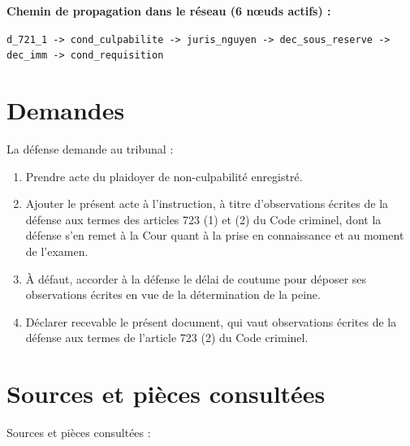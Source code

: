 \documentclass[12pt,letterpaper,oneside]{article}
\begin{document}
\textbf{Chemin de propagation dans le réseau (6 nœuds actifs) :}

\texttt{d\_721\_1 -> cond\_culpabilite -> juris\_nguyen -> dec\_sous\_reserve -> dec\_imm -> cond\_requisition}


\section{Demandes}
La défense demande au tribunal :

\begin{enumerate}[leftmargin=*]
\item Prendre acte du plaidoyer de non-culpabilité enregistré.
\item Ajouter le présent acte à l'instruction, à titre d'observations écrites de la défense aux termes des articles 723 (1) et (2) du Code criminel, dont la défense s'en remet à la Cour quant à la prise en connaissance et au moment de l'examen.
\item À défaut, accorder à la défense le délai de coutume pour déposer ses observations écrites en vue de la détermination de la peine.
\item Déclarer recevable le présent document, qui vaut observations écrites de la défense aux termes de l'article 723 (2) du Code criminel.
\end{enumerate}

\section{Sources et pièces consultées}
Sources et pi\`eces consult\'ees :
\end{document}
